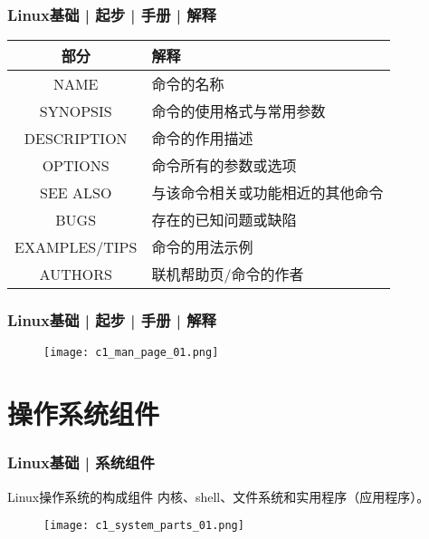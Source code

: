 \begin{frame}
  \frametitle{Linux基础 | 起步 | 手册 | 解释}
  \begin{table}
    \centering
    \begin{tabular}{cl}
      \hline
      \rowcolor{blue!50}部分 & 解释\\
      \hline
      NAME & 命令的名称\\
      SYNOPSIS & 命令的使用格式与常用参数\\
      DESCRIPTION & 命令的作用描述\\
      OPTIONS & 命令所有的参数或选项\\
      SEE ALSO & 与该命令相关或功能相近的其他命令\\
      BUGS & 存在的已知问题或缺陷\\
      EXAMPLES/TIPS & 命令的用法示例\\
      AUTHORS & 联机帮助页/命令的作者\\
      \hline
    \end{tabular}
  \end{table}
\end{frame}

\begin{frame}
  \frametitle{Linux基础 | 起步 | 手册 | 解释}
  \begin{figure}
    \centering
    \texttt{[image: c1\_man\_page\_01.png]}
  \end{figure}
\end{frame}


\section{操作系统组件}
\begin{frame}
  \frametitle{Linux基础 | 系统组件}
  \begin{block}{Linux操作系统的\alert{构成组件}}
    内核、shell、文件系统和实用程序（应用程序）。
  \end{block}
  \begin{figure}
    \centering
    \texttt{[image: c1\_system\_parts\_01.png]}
  \end{figure}
\end{frame}


